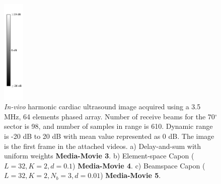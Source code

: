 \documentclass[journal]{IEEEtran}
\newcommand{\degree}{\ensuremath{^\circ}}
\newcommand\multimedia[1]{\textbf{{\color{red}#1}}}
\begin{document}
\begin{figure}[!t]
\centerline{
\hfil
{}
\hfil
{}
\hfil
\includegraphics[width=0.4in]{gfx/colorBarInvivo2.png}
}
\caption{\textit{In-vivo} harmonic cardiac ultrasound image acquired using a 3.5 MHz, 64 elements phased array. Number of receive beams for the $70\degree$ sector is 98, and number of samples in range is 610. Dynamic range is -20 dB to 20 dB with mean value represented as 0 dB. The image is the first frame in the attached videos. a) Delay-and-sum with uniform weights \multimedia{Media-Movie 3}. b) Element-space Capon ($L=32, K=2, d=0.1$) \multimedia{Media-Movie 4}. c) Beamspace Capon ($L=32, K=2, N_b=3, d=0.01$) \multimedia{Media-Movie 5}.}
\label{fig:invivo}
\end{figure}
\end{document}
